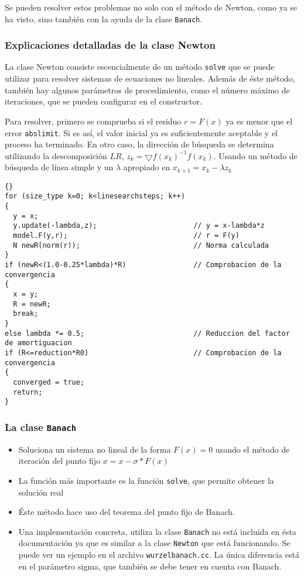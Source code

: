 \documentclass[a4paper,11pt]{article}
\theoremstyle{definition}
\begin{document}
Se pueden resolver estos problemas no solo con el método de Newton, como ya se ha visto, sino también con la ayuda de la clase \lstinline{Banach}.

\subsubsection{Explicaciones detalladas de la clase Newton}
La clase Newton consiste escencialmente de un método \lstinline{solve} que se puede
utilizar para resolver sistemas de ecuaciones no lineales. Además de éste método,
también hay algunos parámetros de procedimiento, como el número máximo de iteraciones,
que se pueden configurar en el constructor.

Para resolver, primero se comprueba si el residuo $r=F(x)$ ya es menor que el error \lstinline{abslimit}. Si es así, el valor inicial ya es suficientemente aceptable y el proceso ha terminado. En otro caso, la dirección de búsqueda se determina utilizando la descomposición $LR$, $z_k = \bigtriangledown f(x_k)^{-1}f(x_k)$.  Usando un método de búsqueda de línea
simple y un $\lambda$ apropiado en $x_{k+1}=x_k-\lambda z_k$

{\footnotesize{\begin{lstlisting}{}
for (size_type k=0; k<linesearchsteps; k++)
{
  y = x;
  y.update(-lambda,z);                       // y = x-lambda*z
  model.F(y,r);                              // r = F(y)
  N newR(norm(r));                           // Norma calculada
}
if (newR<(1.0-0.25*lambda)*R)                // Comprobacion de la convergencia
{
  x = y;
  R = newR;
  break;
}
else lambda *= 0.5;                          // Reduccion del factor de amortiguacion
if (R<=reduction*R0)                         // Comprobacion de la convergencia
{
  converged = true;
  return;
}
\end{lstlisting}}}


\subsubsection{La clase \lstinline{Banach}}
\begin{itemize}
\item Soluciona un sistema no lineal de la forma $F(x)=0$ usando el método de iteración del punto fijo $x = x - \sigma*F(x)$
\item La función más importante es la función \lstinline{solve}, que permite obtener la solución real
\item Éste método hace uso del teorema del punto fijo de Banach.
\item Una implementación concreta, utiliza la clase \lstinline{Banach} 
no está incluida en ésta documentación ya que es similar a la clase
  \lstinline{Newton} que está funcionando. Se puede ver un ejemplo en el archivo
  \lstinline{wurzelbanach.cc}. La única diferencia está en el parámetro sigma, que también se debe tener en cuenta con Banach.
\end{itemize}
\end{document}
